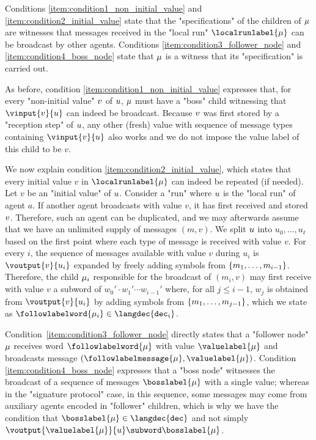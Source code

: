 Conditions \ref{item:condition1_non_initial_value} and \ref{item:condition2_initial_value} state that the "specifications" of the children of $\mu$ are witnesses that messages received in the "local run" $\localrunlabel{\node}$ can be broadcast by other agents. 
Conditions \ref{item:condition3_follower_node} and \ref{item:condition4_boss_node} state that $\mu$ is a witness that its "specification" is carried out. 

As before, condition \ref{item:condition1_non_initial_value} expresses that, for every "non-initial value" $v$ of $u$, $\mu$ must have a "boss" child witnessing that $\vinput{v}{\localrun}$ can indeed be broadcast. 
Because $v$ was first stored by a "reception step" of $u$, any other (fresh) value with sequence of message types containing $\vinput{v}{\localrun}$ also works and we do not impose the value label of this child to be $v$. 

We now explain condition \ref{item:condition2_initial_value}, which states that every initial value $v$ in $\localrunlabel{\node}$ can indeed be repeated (if needed). Let $v$ be an "initial value" of $u$. Consider a "run" where $u$ is the "local run" of agent $a$. If another agent broadcasts with value $v$, it has first received and stored $v$. Therefore, such an agent can be duplicated, and we may afterwards assume that we have an unlimited supply of messages $(m,v)$.
We split $u$ into $u_0,\dots,u_\ell$ based on the first point where each type of message is received with value $v$. For every $i$, the sequence of messages available with value $v$ during $u_i$ is $\voutput{v}{u_i}$ expanded by freely adding symbols from $\{m_1,\dots, m_{i-1}\}$. Therefore, the child $\mu_i$ responsible for the broadcast of $(m_i,v)$ may first receive with value $v$ a subword of $w_0' \cdot w_1' \cdots w_{i-1}'$ where, for all $j \leq i-1$, $w_j$ is obtained from $\voutput{v}{u_i}$ by adding symbols from $\{m_1, \dots, m_{j-1}\}$, which we state as $\followlabelword{\node_i} \in \langdec{\decsymb_i}$.   

Condition~\ref{item:condition3_follower_node} directly states that a "follower node" $\mu$ receives word $\followlabelword{\node}$ with value $\valuelabel{\node}$ and broadcasts message $(\followlabelmessage{\node}, \valuelabel{\node})$. Condition \ref{item:condition4_boss_node} expresses that a "boss node" witnesses the broadcast of a sequence of messages $\bosslabel{\node}$ with a single value; whereas in the "signature protocol" case, in this sequence, some messages may come from auxiliary agents encoded in "follower" children, which is why we have the condition that $\bosslabel{\node} \in \langdec{\decsymb}$ and not simply $ \voutput{\valuelabel{\node}}{\localrun} \subword \bosslabel{\node}$. 


